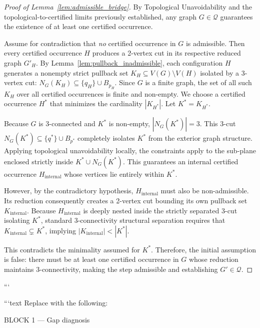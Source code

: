 \begin{proof}[Proof of Lemma~\ref{lem:admissible_bridge}]
By Topological Unavoidability and the topological-to-certified limits previously established, any graph $G \in \mathcal{Q}$ guarantees the existence of at least one certified occurrence.

Assume for contradiction that \emph{no} certified occurrence in $G$ is admissible. Then every certified occurrence $H$ produces a 2-vertex cut in its respective reduced graph $G'_H$.
By Lemma~\ref{lem:pullback_inadmissible}, each configuration $H$ generates a nonempty strict pullback set $K_H \subseteq V(G) \setminus V(H)$ isolated by a 3-vertex cut: $N_G(K_H) \subseteq \{q_H\} \cup B_{p_H}$.
Since $G$ is a finite graph, the set of all such $K_H$ over all certified occurrences is finite and non-empty. We choose a certified occurrence $H^*$ that minimizes the cardinality $|K_{H^*}|$. Let $K^* = K_{H^*}$.

Because $G$ is 3-connected and $K^*$ is non-empty, $|N_G(K^*)| = 3$. This 3-cut $N_G(K^*) \subseteq \{q^*\} \cup B_{p^*}$ completely isolates $K^*$ from the exterior graph structure. 
Applying topological unavoidability locally, the constraints apply to the sub-plane enclosed strictly inside $K^* \cup N_G(K^*)$. This guarantees an internal certified occurrence $H_{\mathrm{internal}}$ whose vertices lie entirely within $K^*$.

However, by the contradictory hypothesis, $H_{\mathrm{internal}}$ must also be non-admissible. Its reduction consequently creates a 2-vertex cut bounding its own pullback set $K_{\mathrm{internal}}$. Because $H_{\mathrm{internal}}$ is deeply nested inside the strictly separated 3-cut isolating $K^*$, standard 3-connectivity structural separation requires that $K_{\mathrm{internal}} \subsetneq K^*$, implying $|K_{\mathrm{internal}}| < |K^*|$.

This contradicts the minimality assumed for $K^*$. Therefore, the initial assumption is false: there must be at least one certified occurrence in $G$ whose reduction maintains 3-connectivity, making the step admissible and establishing $G' \in \mathcal{Q}$.
\end{proof}


```

```text
Replace with the following:

BLOCK 1 — Gap diagnosis

